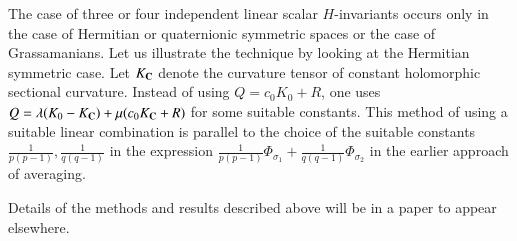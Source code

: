The case of three or four independent linear scalar $H$-invariants occurs only in the case of Hermitian or quaternionic symmetric spaces or the case of Grassamanians. Let us illustrate the technique by looking at the Hermitian symmetric case. Let $K_{\mathbf{C}}$ denote the curvature tensor of constant holomorphic sectional curvature. Instead of using $Q=c_{0}K_{0} + R$, one uses $Q=\lambda(K_{0}-K_{\mathbf{C}}) + \mu (c_{0}K_{\mathbf{C}} + R)$ for some suitable constants. This method of using a suitable linear combination is parallel to the choice of the suitable constants $\frac{1}{p(p-1)}, \frac{1}{q(q-1)}$ in the expression $\frac{1}{p(p-1)}\Phi_{\sigma_{1}} + \frac{1}{q(q-1)}\Phi_{\sigma_{2}}$ in the earlier approach of averaging.

Details of the methods and results described above will be in a paper to appear elsewhere.


